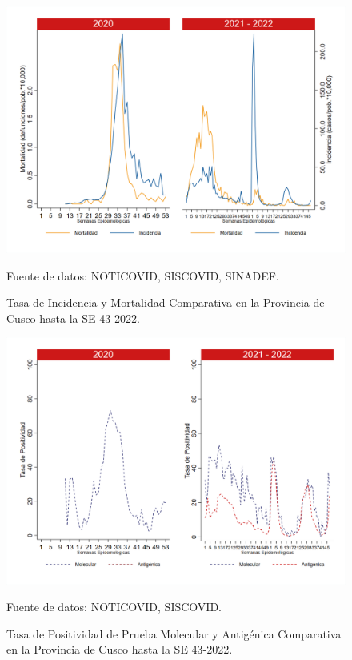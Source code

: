 \documentclass[12pt,a4paper,openany]{book}
\begin{document}
	\begin{figure}[h]
		\caption{Tasa de Incidencia y Mortalidad Comparativa en la Provincia de Cusco hasta la SE 43-2022.}\label{fig:inc_mort_cusco}
		\begin{center}
			\includegraphics[width=0.85\linewidth]{../figuras/incidencia_mortalidad_20_21_7.png}
		\end{center}
		{\footnotesize {Fuente de datos: NOTICOVID, SISCOVID, SINADEF.}}
	\end{figure}
	
	\begin{figure}[h]
		\caption{Tasa de Positividad de Prueba Molecular y Antigénica Comparativa en la Provincia de Cusco hasta la SE 43-2022.}\label{fig:positividad_cusco}
		\begin{center}
			\includegraphics[width=0.7\linewidth]{../figuras/positividad_20_21_7.png}
		\end{center}
		{\footnotesize {Fuente de datos: NOTICOVID, SISCOVID.}}
	\end{figure}
	
\end{document}
